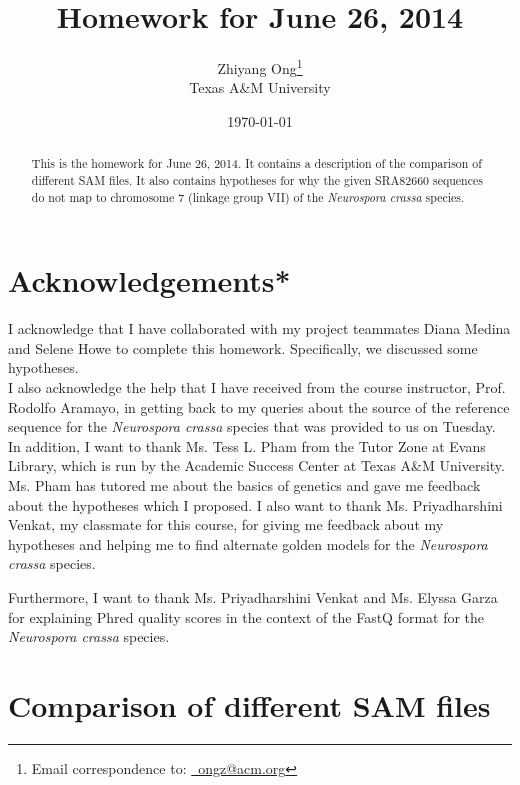 \documentclass[letter,12pt]{article}
\begin{document}
\title{Homework for June 26, 2014}
\date{\today}
\author{Zhiyang Ong\thanks{Email correspondence to: \href{mailto:ongz@acm.org}{\Email\ ongz@acm.org}}\\
	Texas A\&M University
}
\maketitle


\begin{abstract} 
This is the homework for June 26, 2014. It contains a description of the comparison of different SAM files. It also contains hypotheses for why the given SRA82660 sequences do not map to chromosome 7 (linkage group VII) of the {\it Neurospora crassa} species.
\end{abstract}




\section{Acknowledgements*}
\label{sec:Acknowledgement*}

I acknowledge that I have collaborated with my project teammates Diana Medina and Selene Howe to complete this homework. Specifically, we discussed some hypotheses. \\

I also acknowledge the help that I have received from the course instructor, Prof. Rodolfo Aramayo, in getting back to my queries about the source of the reference sequence for the {\it Neurospora crassa} species that was provided to us on Tuesday. \\

In addition, I want to thank Ms. Tess L. Pham from the Tutor Zone at Evans Library, which is run by the Academic Success Center at Texas A\&M University. Ms. Pham has tutored me about the basics of genetics and gave me feedback about the hypotheses which I proposed. I also want to thank Ms. Priyadharshini Venkat, my classmate for this course, for giving me feedback about my hypotheses and helping me to find alternate golden models for the {\it Neurospora crassa} species.

Furthermore, I want to thank Ms. Priyadharshini Venkat and Ms. Elyssa Garza for explaining Phred quality scores in the context of the FastQ format for the {\it Neurospora crassa} species.

\section{Comparison of different SAM files}
\label{sec:ComparisonofDifferentSAMfiles}
\end{document}
